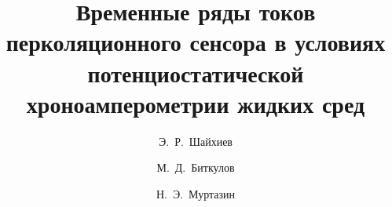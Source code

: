 

\usepackage{todonotes} %

\usepackage[russian]{nla}

%
%


%



\fi
%

\title{Временные ряды токов перколяционного сенсора в условиях потенциостатической хроноамперометрии жидких сред}
\author{Э.~Р.~Шайхиев  \and  М.~Д.~Биткулов  \and  Н.~Э.~Муртазин
} %


\maketitle

